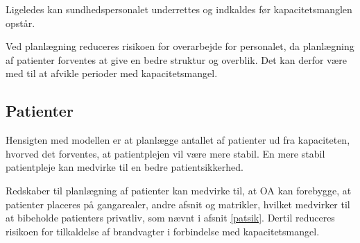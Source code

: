 
Ligeledes kan sundhedspersonalet underrettes og indkaldes før kapacitetsmanglen opstår.


Ved planlægning reduceres risikoen for overarbejde for personalet, da planlægning af patienter forventes at give en bedre struktur og overblik. Det kan derfor være med til at afvikle perioder med kapacitetsmangel.


\subsection{Patienter}
Hensigten med modellen er at planlægge antallet af patienter ud fra kapaciteten, hvorved det forventes, at patientplejen vil være mere stabil. En mere stabil patientpleje kan medvirke til en bedre patientsikkerhed. 



Redskaber til planlægning af patienter kan medvirke til, at OA kan forebygge, at patienter placeres på gangarealer, andre afsnit og matrikler, hvilket medvirker til at bibeholde patienters privatliv, som nævnt i afsnit \ref{patsik}. Dertil reduceres risikoen for tilkaldelse af brandvagter i forbindelse med kapacitetsmangel. 









